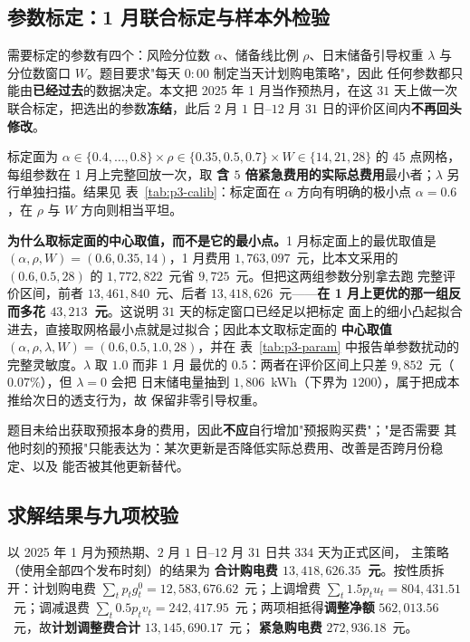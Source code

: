 \subsection{参数标定：1 月联合标定与样本外检验}

需要标定的参数有四个：风险分位数 $\alpha$、储备线比例 $\rho$、日末储备引导权重
$\lambda$ 与分位数窗口 $W$。题目要求"每天 $0{:}00$ 制定当天计划购电策略"，因此
任何参数都只能由\textbf{已经过去}的数据决定。本文把 2025 年 1 月当作预热月，在这
$31$ 天上做一次联合标定，把选出的参数\textbf{冻结}，此后 $2$ 月 $1$ 日--$12$ 月
$31$ 日的评价区间内\textbf{不再回头修改}。

标定面为 $\alpha\in\{0.4,\dots,0.8\}\times\rho\in\{0.35,0.5,0.7\}
\times W\in\{14,21,28\}$ 的 $45$ 点网格，每组参数在 1 月上完整回放一次，取
\textbf{含 $5$ 倍紧急费用的实际总费用}最小者；$\lambda$ 另行单独扫描。结果见
表~\ref{tab:p3-calib}：标定面在 $\alpha$ 方向有明确的极小点 $\alpha=0.6$，在
$\rho$ 与 $W$ 方向则相当平坦。

\textbf{为什么取标定面的中心取值，而不是它的最小点。}1 月标定面上的最优取值是
$(\alpha,\rho,W)=(0.6,0.35,14)$，1 月费用 $1{,}763{,}097$~元，比本文采用的
$(0.6,0.5,28)$ 的 $1{,}772{,}822$~元省 $9{,}725$~元。但把这两组参数分别拿去跑
完整评价区间，前者 $13{,}461{,}840$~元、后者 $13{,}418{,}626$~元——\textbf{在 1
月上更优的那一组反而多花 $43{,}213$~元}。这说明 $31$ 天的标定窗口已经足以把标定
面上的细小凸起拟合进去，直接取网格最小点就是过拟合；因此本文取标定面的
\textbf{中心取值} $(\alpha,\rho,\lambda,W)=(0.6,0.5,1.0,28)$，并在
表~\ref{tab:p3-param} 中报告单参数扰动的完整灵敏度。$\lambda$ 取 $1.0$ 而非 1 月
最优的 $0.5$：两者在评价区间上只差 $9{,}852$~元（$0.07\%$），但 $\lambda=0$ 会把
日末储电量抽到 $1{,}806$~kWh（下界为 $1200$），属于把成本推给次日的透支行为，故
保留非零引导权重。

题目未给出获取预报本身的费用，因此\textbf{不应}自行增加"预报购买费"；"是否需要
其他时刻的预报"只能表达为：某次更新是否降低实际总费用、改善是否跨月份稳定、以及
能否被其他更新替代。



\subsection{求解结果与九项校验}

以 2025 年 1 月为预热期、$2$ 月 $1$ 日--$12$ 月 $31$ 日共 $334$ 天为正式区间，
主策略（使用全部四个发布时刻）的结果为 \textbf{合计购电费
$13{,}418{,}626.35$~元}。按性质拆开：计划购电费
$\sum_tp_tg_t^0=12{,}583{,}676.62$~元；上调增费
$\sum_t1.5p_tu_t=804{,}431.51$~元；调减退费
$\sum_t0.5p_tv_t=242{,}417.95$~元；两项相抵得\textbf{调整净额}
$562{,}013.56$~元，故\textbf{计划调整费合计} $13{,}145{,}690.17$~元；
\textbf{紧急购电费} $272{,}936.18$~元。

